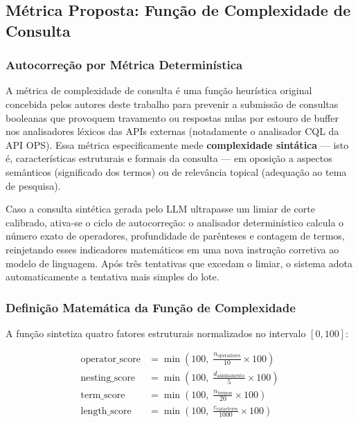 \documentclass[12pt, a4paper]{article}
\begin{document}
  \subsection{Métrica Proposta: Função de Complexidade de Consulta}
  \label{sec:complexidade}

    \subsubsection{Autocorreção por Métrica Determinística}

  A métrica de complexidade de consulta é uma função heurística original concebida pelos autores deste trabalho para prevenir a submissão de consultas booleanas que provoquem travamento ou respostas nulas por estouro de buffer nos analisadores léxicos das APIs externas (notadamente o analisador CQL da API OPS). Essa métrica especificamente mede \textbf{complexidade sintática} --- isto é, características estruturais e formais da consulta --- em oposição a aspectos semânticos (significado dos termos) ou de relevância topical (adequação ao tema de pesquisa).

  Caso a consulta sintética gerada pelo LLM ultrapasse um limiar de corte calibrado, ativa-se o ciclo de autocorreção: o analisador determinístico calcula o número exato de operadores, profundidade de parênteses e contagem de termos, reinjetando esses indicadores matemáticos em uma nova instrução corretiva ao modelo de linguagem. Após três tentativas que excedam o limiar, o sistema adota automaticamente a tentativa mais simples do lote.

    \subsubsection{Definição Matemática da Função de Complexidade}

  A função sintetiza quatro fatores estruturais normalizados no intervalo $[0, 100]$:

$$
\begin{aligned}
\text{operator\_score} &= \min\left(100,\; \frac{n_{\text{operadores}}}{10} \times 100\right) \\[4pt]
\text{nesting\_score} &= \min\left(100,\; \frac{d_{\text{aninhamento}}}{5} \times 100\right) \\[4pt]
\text{term\_score} &= \min\left(100,\; \frac{n_{\text{termos}}}{20} \times 100\right) \\[4pt]
\text{length\_score} &= \min\left(100,\; \frac{c_{\text{caracteres}}}{1000} \times 100\right)
\end{aligned}
$$
\end{document}
